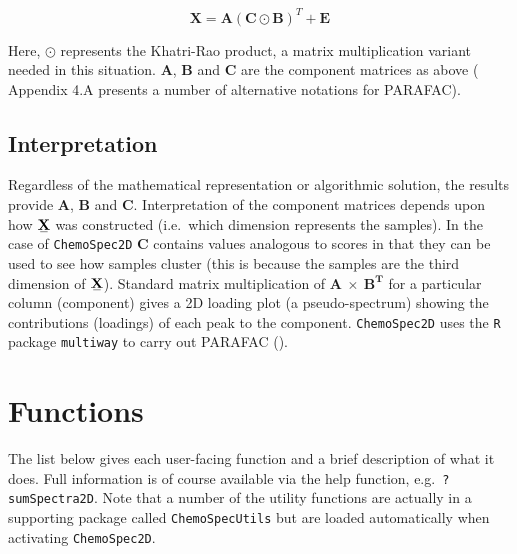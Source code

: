 \documentclass[letter,10pt,twocolumn,twoside,printwatermark=false]{pinp}
\begin{document}
\[
\mathbf{X} = \mathbf{A}(\mathbf{C} \odot \mathbf{B})^T + \mathbf{E}
\]

Here, \(\odot\) represents the Khatri-Rao product, a matrix
multiplication variant needed in this situation. \(\mathbf{A}\),
\(\mathbf{B}\) and \(\mathbf{C}\) are the component matrices as above
(\cite{Bro2003b, Smilde2004} Appendix 4.A presents a number of
alternative notations for PARAFAC).

\hypertarget{interpretation}{%
\subsection{Interpretation}\label{interpretation}}

Regardless of the mathematical representation or algorithmic solution,
the results provide \(\mathbf{A}\), \(\mathbf{B}\) and \(\mathbf{C}\).
Interpretation of the component matrices depends upon how
\(\stackunder[1.2pt]{$\mathbf{X}$}{\rule{1.2ex}{.075ex}}\) was
constructed (i.e.~which dimension represents the samples). In the case
of \texttt{ChemoSpec2D} \(\mathbf{C}\) contains values analogous to
scores in that they can be used to see how samples cluster (this is
because the samples are the third dimension of
\(\stackunder[1.2pt]{$\mathbf{X}$}{\rule{1.2ex}{.075ex}}\)). Standard
matrix multiplication of \(\mathbf{A} \ \times \ \mathbf{B^T}\) for a
particular column (component) gives a 2D loading plot (a
pseudo-spectrum) showing the contributions (loadings) of each peak to
the component. \texttt{ChemoSpec2D} uses the \texttt{R} package
\texttt{multiway} to carry out PARAFAC (\cite{Helwig2017}).

\hypertarget{functions}{%
\section{Functions}\label{functions}}

The list below gives each user-facing function and a brief description
of what it does. Full information is of course available via the help
function, e.g.~\texttt{?sumSpectra2D}. Note that a number of the utility
functions are actually in a supporting package called
\texttt{ChemoSpecUtils} but are loaded automatically when activating
\texttt{ChemoSpec2D}.
\end{document}

